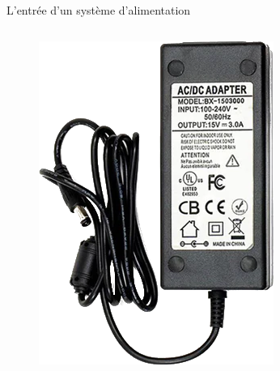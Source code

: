 \begin{frame}{L'entrée d'un système d'alimentation}
\begin{columns}
\begin{column}{0.33\textwidth}
\begin{figure}
                \includegraphics[width=\textwidth]{pictures/power-brick.png}
            \end{figure}
        \end{column}
    \end{columns}
\end{frame}


